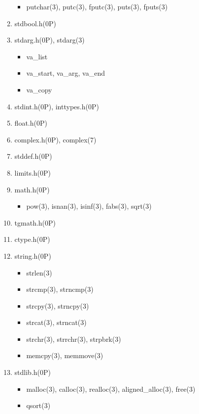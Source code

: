 \documentclass{article}
\begin{document}
\begin{enumerate}
\begin{enumerate}
\begin{itemize}
                    \item putchar(3), putc(3), fputc(3), puts(3), fputs(3)
                \end{itemize}
            \item stdbool.h(0P)
            \item stdarg.h(0P), stdarg(3)
                \begin{itemize}
                    \item va_list
                    \item va_start, va_arg, va_end
                    \item va_copy
                \end{itemize}
            \item stdint.h(0P), inttypes.h(0P)
            \item float.h(0P)
            \item complex.h(0P), complex(7)
            \item stddef.h(0P)
            \item limits.h(0P)
            \item math.h(0P)
                \begin{itemize}
                    \item pow(3), isnan(3), isinf(3), fabs(3), sqrt(3)
                \end{itemize}
            \item tgmath.h(0P)
            \item ctype.h(0P)
            \item string.h(0P)
                \begin{itemize}
                    \item strlen(3)
                    \item strcmp(3), strncmp(3)
                    \item strcpy(3), strncpy(3)
                    \item strcat(3), strncat(3)
                    \item strchr(3), strrchr(3), strpbrk(3)
                    \item memcpy(3), memmove(3)
                \end{itemize}
            \item stdlib.h(0P)
                \begin{itemize}
                    \item malloc(3), calloc(3), realloc(3), aligned_alloc(3), free(3)
                    \item qsort(3)

\end{itemize}
\end{enumerate}
\end{enumerate}
\end{document}
